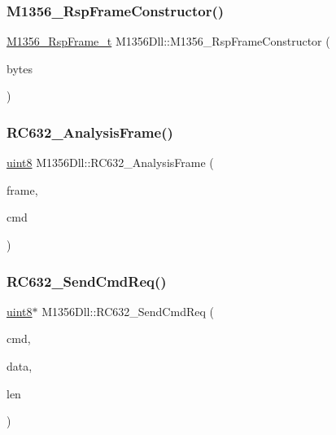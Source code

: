 \subsubsection{\texorpdfstring{M1356\_RspFrameConstructor()}{M1356\_RspFrameConstructor()}}
{\footnotesize\ttfamily \mbox{\hyperlink{struct_m1356___rsp_frame__t}{M1356\+\_\+\+Rsp\+Frame\+\_\+t}} M1356\+Dll\+::\+M1356\+\_\+\+Rsp\+Frame\+Constructor (\begin{DoxyParamCaption}\item[{Q\+Byte\+Array}]{bytes }\end{DoxyParamCaption})}

\mbox{\label{class_m1356_dll_a40aed3801baa294bf828c5ab794ef82e}} 
\subsubsection{\texorpdfstring{RC632\_AnalysisFrame()}{RC632\_AnalysisFrame()}}
{\footnotesize\ttfamily \mbox{\hyperlink{m1356dll_8h_adde6aaee8457bee49c2a92621fe22b79}{uint8}} M1356\+Dll\+::\+R\+C632\+\_\+\+Analysis\+Frame (\begin{DoxyParamCaption}\item[{\mbox{\hyperlink{m1356dll_8h_adde6aaee8457bee49c2a92621fe22b79}{uint8}} $\ast$}]{frame,  }\item[{\mbox{\hyperlink{m1356dll_8h_a05f6b0ae8f6a6e135b0e290c25fe0e4e}{uint16}}}]{cmd }\end{DoxyParamCaption})}

\mbox{\label{class_m1356_dll_ab86ae59233d587f4688470796cbb85b1}} 
\subsubsection{\texorpdfstring{RC632\_SendCmdReq()}{RC632\_SendCmdReq()}}
{\footnotesize\ttfamily \mbox{\hyperlink{m1356dll_8h_adde6aaee8457bee49c2a92621fe22b79}{uint8}}$\ast$ M1356\+Dll\+::\+R\+C632\+\_\+\+Send\+Cmd\+Req (\begin{DoxyParamCaption}\item[{\mbox{\hyperlink{m1356dll_8h_a05f6b0ae8f6a6e135b0e290c25fe0e4e}{uint16}}}]{cmd,  }\item[{const \mbox{\hyperlink{m1356dll_8h_adde6aaee8457bee49c2a92621fe22b79}{uint8}} $\ast$}]{data,  }\item[{\mbox{\hyperlink{m1356dll_8h_a05f6b0ae8f6a6e135b0e290c25fe0e4e}{uint16}}}]{len }\end{DoxyParamCaption})}


